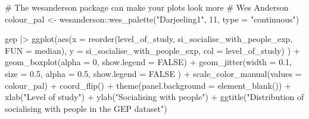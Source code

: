 \documentclass[
  letterpaper,
]{krantz}
\makeatletter
\newenvironment{Shaded}{\begin{snugshade}}{\end{snugshade}}
\newcommand{\AttributeTok}[1]{\textcolor[rgb]{0.40,0.45,0.13}{#1}}
\newcommand{\CommentTok}[1]{\textcolor[rgb]{0.37,0.37,0.37}{#1}}
\newcommand{\ConstantTok}[1]{\textcolor[rgb]{0.56,0.35,0.01}{#1}}
\newcommand{\DecValTok}[1]{\textcolor[rgb]{0.68,0.00,0.00}{#1}}
\newcommand{\FloatTok}[1]{\textcolor[rgb]{0.68,0.00,0.00}{#1}}
\newcommand{\FunctionTok}[1]{\textcolor[rgb]{0.28,0.35,0.67}{#1}}
\newcommand{\NormalTok}[1]{\textcolor[rgb]{0.00,0.23,0.31}{#1}}
\newcommand{\OtherTok}[1]{\textcolor[rgb]{0.00,0.23,0.31}{#1}}
\newcommand{\SpecialCharTok}[1]{\textcolor[rgb]{0.37,0.37,0.37}{#1}}
\newcommand{\StringTok}[1]{\textcolor[rgb]{0.13,0.47,0.30}{#1}}
\newenvironment{kframe}{%
\medskip{}
\setlength{\fboxsep}{.8em}
 \def\at@end@of@kframe{}%
 \ifinner\ifhmode%
  \def\at@end@of@kframe{\end{minipage}}%
  \begin{minipage}{\columnwidth}%
 \fi\fi%
 \def\FrameCommand##1{\hskip\@totalleftmargin \hskip-\fboxsep
 \colorbox{shadecolor}{##1}\hskip-\fboxsep
     \hskip-\linewidth \hskip-\@totalleftmargin \hskip\columnwidth}%
 \MakeFramed {\advance\hsize-\width
   \@totalleftmargin\z@ \linewidth\hsize
   \@setminipage}}%
 {\par\unskip\endMakeFramed%
 \at@end@of@kframe}
\renewenvironment{Shaded}{\begin{kframe}}{\end{kframe}}
\makeatother
\begin{document}
\begin{Shaded}
\begin{Highlighting}[]
\CommentTok{\# The wesanderson package can make your plots look more}
\CommentTok{\# \textquotesingle{}Wes Anderson\textquotesingle{}}
\NormalTok{colour\_pal }\OtherTok{\textless{}{-}}
\NormalTok{  wesanderson}\SpecialCharTok{::}\FunctionTok{wes\_palette}\NormalTok{(}\StringTok{"Darjeeling1"}\NormalTok{,}
                           \DecValTok{11}\NormalTok{,}
                           \AttributeTok{type =} \StringTok{"continuous"}\NormalTok{)}

\NormalTok{gep }\SpecialCharTok{|\textgreater{}}
  \FunctionTok{ggplot}\NormalTok{(}\FunctionTok{aes}\NormalTok{(}\AttributeTok{x =} \FunctionTok{reorder}\NormalTok{(level\_of\_study,}
\NormalTok{                         si\_socialise\_with\_people\_exp,}
                         \AttributeTok{FUN =}\NormalTok{ median),}
             \AttributeTok{y =}\NormalTok{ si\_socialise\_with\_people\_exp,}
             \AttributeTok{col =}\NormalTok{ level\_of\_study)}
\NormalTok{         ) }\SpecialCharTok{+}
  \FunctionTok{geom\_boxplot}\NormalTok{(}\AttributeTok{alpha =} \DecValTok{0}\NormalTok{,}
               \AttributeTok{show.legend =} \ConstantTok{FALSE}\NormalTok{) }\SpecialCharTok{+}
  \FunctionTok{geom\_jitter}\NormalTok{(}\AttributeTok{width =} \FloatTok{0.1}\NormalTok{,}
              \AttributeTok{size =} \FloatTok{0.5}\NormalTok{,}
              \AttributeTok{alpha =} \FloatTok{0.5}\NormalTok{,}
              \AttributeTok{show.legend =} \ConstantTok{FALSE}
\NormalTok{              ) }\SpecialCharTok{+}
  \FunctionTok{scale\_color\_manual}\NormalTok{(}\AttributeTok{values =}\NormalTok{ colour\_pal) }\SpecialCharTok{+}
  \FunctionTok{coord\_flip}\NormalTok{() }\SpecialCharTok{+}
  \FunctionTok{theme}\NormalTok{(}\AttributeTok{panel.background =} \FunctionTok{element\_blank}\NormalTok{()) }\SpecialCharTok{+}
  \FunctionTok{xlab}\NormalTok{(}\StringTok{"Level of study"}\NormalTok{) }\SpecialCharTok{+}
  \FunctionTok{ylab}\NormalTok{(}\StringTok{"Socialising with people"}\NormalTok{) }\SpecialCharTok{+}
  \FunctionTok{ggtitle}\NormalTok{(}\StringTok{"Distribution of \textquotesingle{}socialising with people\textquotesingle{} in the GEP dataset"}\NormalTok{)}
\end{Highlighting}
\end{Shaded}
\end{document}
